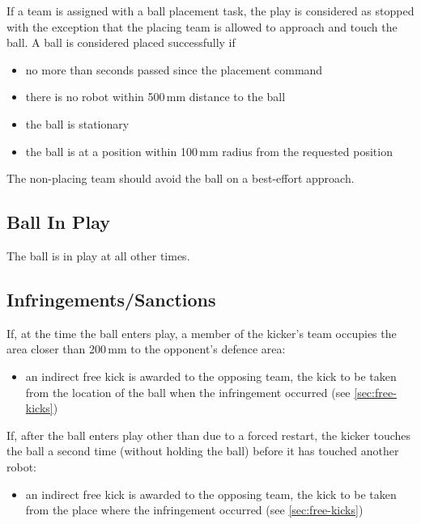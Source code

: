 
If a team is assigned with a ball placement task, the play is considered as stopped
with the exception that the placing team is allowed to approach and touch the ball.
A ball is considered placed successfully if

\begin{itemize}
\item no more than   seconds passed since the placement command
\item there is no robot within 500\,mm distance to the ball
\item the ball is stationary
\item the ball is at a position within 100\,mm radius from the requested position
\end{itemize}

The non-placing team should avoid the ball on a best-effort approach.



\subsection{Ball In Play}
The ball is in play at all other times.

\subsection{Infringements/Sanctions}
If, at the time the ball enters play, a member of the kicker's team occupies the area closer than 200\,mm to the opponent's defence area:
\begin{itemize}
\item an indirect free kick is awarded to the opposing team, the kick to be taken from the location of the ball when the infringement occurred (see \autoref{sec:free-kicks})
\end{itemize}

If, after the ball enters play other than due to a forced restart, the kicker touches the ball a second time (without holding the ball) before it has touched another robot:
\begin{itemize}
\item an indirect free kick is awarded to the opposing team, the kick to be taken from the place where the infringement occurred (see \autoref{sec:free-kicks})
\end{itemize}

